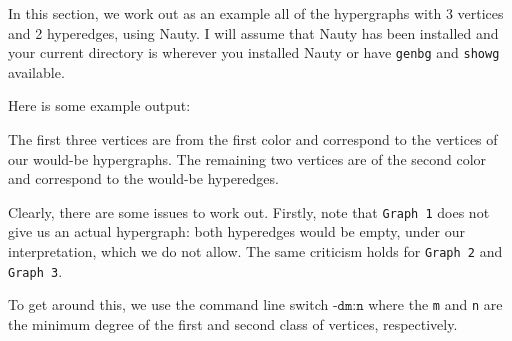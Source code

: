 In this section, we work out as an example all of the hypergraphs with 3 vertices and 2 hyperedges, using Nauty.
I will assume that Nauty has been installed and your current directory is wherever you installed Nauty or have \texttt{genbg} and \texttt{showg} available.

Here is some example output:

The first three vertices are from the first color and correspond to the vertices of our would-be hypergraphs.
The remaining two vertices are of the second color and correspond to the would-be hyperedges.

Clearly, there are some issues to work out. Firstly, note that \texttt{Graph 1} does not give us an actual hypergraph: both hyperedges would be empty, under our interpretation, which we do not allow. The same criticism holds for \texttt{Graph 2} and \texttt{Graph 3}.

To get around this, we use the command line switch $\texttt{-dm:n}$ where the \texttt{m} and \texttt{n} are the minimum degree of the first and second class of vertices, respectively.

